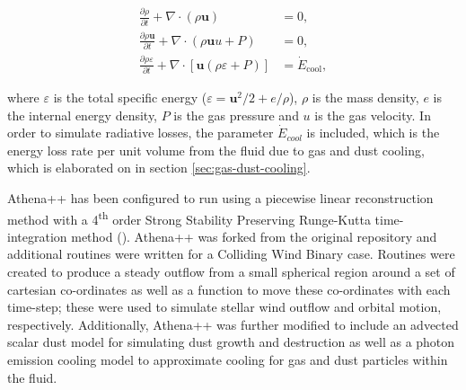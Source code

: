 \documentclass[fleqn,usenatbib]{mnras}
\newcommand{\ts}{\textsuperscript}
\begin{document}
\begin{subequations}
  \begin{align}
    \frac{\partial\rho}{\partial t}+\nabla \cdot \left(\rho \boldsymbol{u}\right) & = 0 , \\
    \frac{\partial \rho \boldsymbol{u}}{\partial t} + \nabla \cdot \left(\rho \boldsymbol{u} u + P \right) & = 0, \\
    \frac{\partial \rho \varepsilon}{\partial t} + \nabla \cdot \left[ \boldsymbol{u} \left( \rho\varepsilon + P \right) \right] & = \dot E_\text{cool} , 
  \end{align}
\end{subequations}

\noindent
where $\varepsilon$ is the total specific energy ($\varepsilon = \boldsymbol{u}^2/2 + e/\rho $), $\rho$ is the mass density, $e$ is the internal energy density, $P$ is the gas pressure and $u$ is the gas velocity.
In order to simulate radiative losses, the parameter $\dot E_{cool}$ is included, which is the energy loss rate per unit volume from the fluid due to gas and dust cooling, which is elaborated on in section \ref{sec:gas-dust-cooling}.


Athena++ has been configured to run using a piecewise linear reconstruction method with a 4\ts{th} order Strong Stability Preserving Runge-Kutta time-integration method (\cite{spiteriNewClassOptimal2002}).
Athena++ was forked from the original repository and additional routines were written for a Colliding Wind Binary case.
Routines were created to produce a steady outflow from a small spherical region around a set of cartesian co-ordinates as well as a function to move these co-ordinates with each time-step; these were used to simulate stellar wind outflow and orbital motion, respectively.
Additionally, Athena++ was further modified to include an advected scalar dust model for simulating dust growth and destruction as well as a photon emission cooling model to approximate cooling for gas and dust particles within the fluid.
\end{document}
